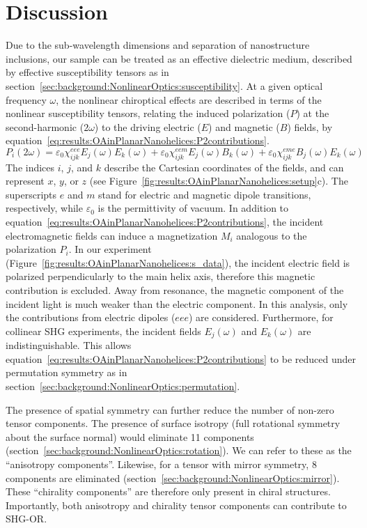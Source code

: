 \section{Discussion}\label{sec:results:OAinPlanarNanohelices:discussion}
Due to the sub-wavelength dimensions and separation of nanostructure inclusions, our sample can be treated as an effective dielectric medium, described by effective susceptibility tensors as in section~\ref{sec:background:NonlinearOptics:susceptibility}.
At a given optical frequency $\omega$, the nonlinear chiroptical effects are described in terms of the nonlinear susceptibility tensors, relating the induced polarization ($P$) at the second-harmonic ($2\omega$) to the driving electric ($E$) and magnetic ($B$) fields, by equation~\ref{eq:results:OAinPlanarNanohelices:P2contributions}.
\begin{equation}\label{eq:results:OAinPlanarNanohelices:P2contributions}	
    {P_i}\left( {2\omega } \right) = 
    \varepsilon{_0}\chi_{ijk}^{eee}{E_j}\left(\omega \right){E_k}\left(\omega \right) + \varepsilon{_0}\chi_{ijk}^{eem}{E_j}\left(\omega \right){B_k}\left(\omega \right) + \varepsilon{_0}\chi_{ijk}^{eme}{B_j}\left(\omega \right){E_k}\left(\omega \right)
\end{equation}
The indices $i$, $j$, and $k$ describe the Cartesian coordinates of the fields, and can represent $x$, $y$, or $z$ (see Figure~\ref{fig:results:OAinPlanarNanohelices:setup}c). 
The superscripts $e$ and $m$ stand for electric and magnetic dipole transitions, respectively, while $\varepsilon{_0}$ is the permittivity of vacuum. 
In addition to equation~\ref{eq:results:OAinPlanarNanohelices:P2contributions}, the incident electromagnetic fields can induce a magnetization $M_i$ analogous to the polarization $P_i$. 
In our experiment (Figure~\ref{fig:results:OAinPlanarNanohelices:s_data}), the incident electric field is polarized perpendicularly to the main helix axis, therefore this magnetic contribution is excluded. Away from resonance, the magnetic component of the incident light is much weaker than the electric component. 
In this analysis, only the contributions from electric dipoles ($eee$) are considered. Furthermore, for collinear SHG experiments, the incident fields ${E_j}(\omega)$ and ${E_k}(\omega)$ are indistinguishable. This allows equation~\ref{eq:results:OAinPlanarNanohelices:P2contributions} to be reduced under permutation symmetry as in section~\ref{sec:background:NonlinearOptics:permutation}.

The presence of spatial symmetry can further reduce the number of non-zero tensor components. The presence of surface isotropy (full rotational symmetry about the surface normal) would eliminate 11 components (section~\ref{sec:background:NonlinearOptics:rotation}). We can refer to these as the ``anisotropy components''. Likewise, for a tensor with mirror symmetry, 8 components are eliminated  (section~\ref{sec:background:NonlinearOptics:mirror}). These ``chirality components'' are therefore only present in chiral structures. Importantly, both anisotropy and chirality tensor components can contribute to SHG-OR. 

